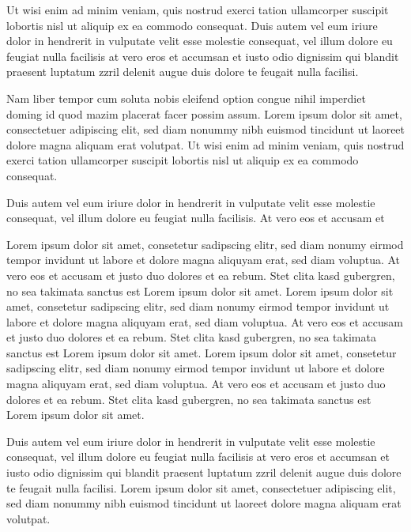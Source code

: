 \documentclass[]{../metanetpaper}
\begin{document}
\begin{Parallel}[c]{80mm}{80mm}
{    Ut wisi enim ad minim veniam, quis nostrud exerci tation ullamcorper suscipit lobortis nisl ut aliquip ex ea commodo consequat. Duis autem vel eum iriure dolor in hendrerit in vulputate velit esse molestie consequat, vel illum dolore eu feugiat nulla facilisis at vero eros et accumsan et iusto odio dignissim qui blandit praesent luptatum zzril delenit augue duis dolore te feugait nulla facilisi.   

    Nam liber tempor cum soluta nobis eleifend option congue nihil imperdiet doming id quod mazim placerat facer possim assum. Lorem ipsum dolor sit amet, consectetuer adipiscing elit, sed diam nonummy nibh euismod tincidunt ut laoreet dolore magna aliquam erat volutpat. Ut wisi enim ad minim veniam, quis nostrud exerci tation ullamcorper suscipit lobortis nisl ut aliquip ex ea commodo consequat.   

    Duis autem vel eum iriure dolor in hendrerit in vulputate velit esse molestie consequat, vel illum dolore eu feugiat nulla facilisis.   
    At vero eos et accusam et
    
    
    Lorem ipsum dolor sit amet, consetetur sadipscing elitr, sed diam nonumy eirmod tempor invidunt ut labore et dolore magna aliquyam erat, sed diam voluptua. At vero eos et accusam et justo duo dolores et ea rebum. Stet clita kasd gubergren, no sea takimata sanctus est Lorem ipsum dolor sit amet. Lorem ipsum dolor sit amet, consetetur sadipscing elitr, sed diam nonumy eirmod tempor invidunt ut labore et dolore magna aliquyam erat, sed diam voluptua. At vero eos et accusam et justo duo dolores et ea rebum. Stet clita kasd gubergren, no sea takimata sanctus est Lorem ipsum dolor sit amet. Lorem ipsum dolor sit amet, consetetur sadipscing elitr, sed diam nonumy eirmod tempor invidunt ut labore et dolore magna aliquyam erat, sed diam voluptua. At vero eos et accusam et justo duo dolores et ea rebum. Stet clita kasd gubergren, no sea takimata sanctus est Lorem ipsum dolor sit amet.   

    Duis autem vel eum iriure dolor in hendrerit in vulputate velit esse molestie consequat, vel illum dolore eu feugiat nulla facilisis at vero eros et accumsan et iusto odio dignissim qui blandit praesent luptatum zzril delenit augue duis dolore te feugait nulla facilisi. Lorem ipsum dolor sit amet, consectetuer adipiscing elit, sed diam nonummy nibh euismod tincidunt ut laoreet dolore magna aliquam erat volutpat.   

}
\end{Parallel}
\end{document}
